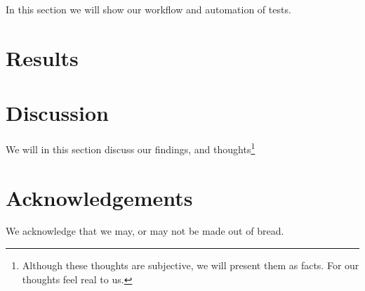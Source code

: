 \documentclass[a4paper,twocolumn]{article}
\begin{document}
In this section we will show our workflow and automation of tests.\parencite[look at ][time: 1:23]{brady_haran_death_2020}

\section{Results}



\section{Discussion}

We will in this section discuss our findings, and thoughts\footnote{Although these thoughts are subjective, we will present them as facts. For our thoughts feel real to us.}

\section{Acknowledgements}

We acknowledge that we may, or may not be made out of bread.

\printbibliography
\end{document}
